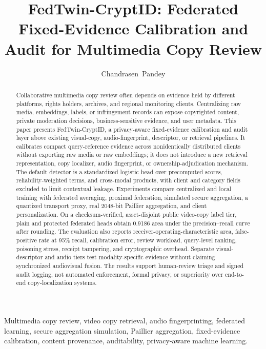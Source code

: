 \documentclass[journal]{IEEEtran}
\newcommand{\ours}{FedTwin-CryptID}
\begin{document}
\title{\ours: Federated Fixed-Evidence Calibration and Audit for Multimedia Copy Review}

\author{Chandrasen~Pandey}

\maketitle

\begin{abstract}
Collaborative multimedia copy review often depends on evidence held by different platforms, rights holders, archives, and regional monitoring clients. Centralizing raw media, embeddings, labels, or infringement records can expose copyrighted content, private moderation decisions, business-sensitive evidence, and user metadata. This paper presents \ours, a privacy-aware fixed-evidence calibration and audit layer above existing visual-copy, audio-fingerprint, descriptor, or retrieval pipelines. It calibrates compact query-reference evidence across nonidentically distributed clients without exporting raw media or raw embeddings; it does not introduce a new retrieval representation, copy localizer, audio fingerprint, or ownership-adjudication mechanism. The default detector is a standardized logistic head over precomputed scores, reliability-weighted terms, and cross-modal products, with client and category fields excluded to limit contextual leakage. Experiments compare centralized and local training with federated averaging, proximal federation, simulated secure aggregation, a quantized transport proxy, real 2048-bit Paillier aggregation, and client personalization. On a checksum-verified, asset-disjoint public video-copy label tier, plain and protected federated heads obtain 0.9186 area under the precision--recall curve after rounding. The evaluation also reports receiver-operating-characteristic area, false-positive rate at 95\% recall, calibration error, review workload, query-level ranking, poisoning stress, receipt tampering, and cryptographic overhead. Separate visual-descriptor and audio tiers test modality-specific evidence without claiming synchronized audiovisual fusion. The results support human-review triage and signed audit logging, not automated enforcement, formal privacy, or superiority over end-to-end copy-localization systems.
\end{abstract}

\begin{IEEEkeywords}
Multimedia copy review, video copy retrieval, audio fingerprinting, federated learning, secure aggregation simulation, Paillier aggregation, fixed-evidence calibration, content provenance, auditability, privacy-aware machine learning.
\end{IEEEkeywords}
\end{document}
